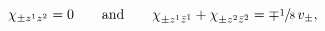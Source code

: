 \begin{equation}
 \chi_{\pm z^1z^2}=0\qquad\text{and}\qquad
 \chi_{\pm z^1\bar{z}^{\bar{1}}}+\chi_{\pm z^2\bar{z}^{\bar{2}}}
 =\mp\sfrac{1}{8}\,v_\pm,
\end{equation}

